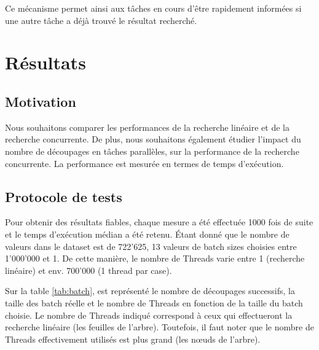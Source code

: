 \documentclass[
  french,
  a4paper,
]{scrartcl}
\begin{document}
Ce mécanisme permet ainsi aux tâches en cours d'être rapidement informées
si une autre tâche a déjà trouvé le résultat recherché. 


\section{Résultats}

\subsection{Motivation}

Nous souhaitons comparer les performances de la recherche linéaire et de la 
recherche concurrente. De plus, nous souhaitons également étudier l'impact
du nombre de découpages en tâches parallèles, sur la performance de la 
recherche concurrente. La performance est mesurée en termes de temps d'exécution.

\subsection{Protocole de tests}

Pour obtenir des résultats fiables, chaque mesure a été effectuée 1000 fois de suite et 
le temps d'exécution médian a été retenu. Étant donné que le nombre de valeurs 
dans le dataset est de 722'625, 13 valeurs de batch sizes choisies entre 1'000'000 et 1. 
De cette manière, le nombre de Threads varie entre 1 (recherche linéaire) et env. 700'000 
(1 thread par case). 

Sur la table \ref{tab:batch}, est représenté le nombre de découpages successifs, 
la taille des batch réelle et le nombre de Threads en fonction de la taille du batch choisie. 
Le nombre de Threads indiqué correspond à ceux qui effectueront la recherche linéaire (les feuilles
de l'arbre). Toutefois, il faut noter que le nombre de Threads effectivement utilisés
est plus grand (les nœuds de l'arbre).
\end{document}
